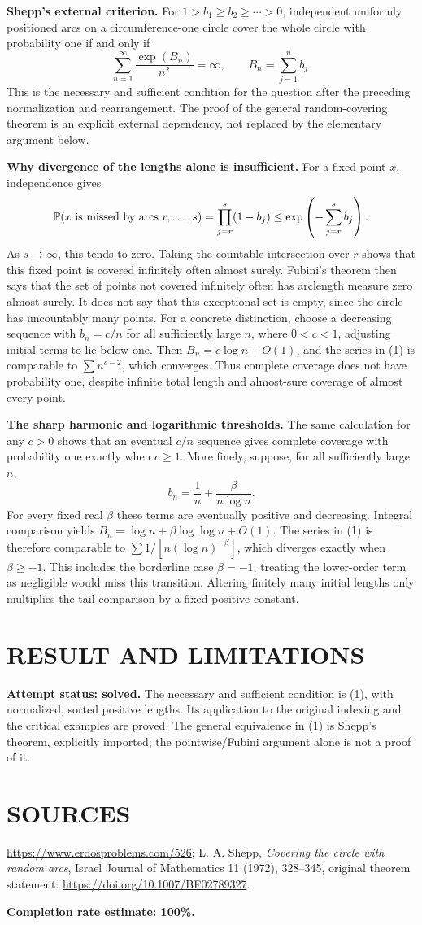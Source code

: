 \textbf{Shepp's external criterion.} For $1>b_1\geq b_2\geq\cdots>0$, independent uniformly positioned arcs on a circumference-one circle cover the whole circle with probability one if and only if
\[
 \boxed{\displaystyle\sum_{n=1}^\infty\frac{\exp(B_n)}{n^2}=\infty,
 \qquad B_n=\sum_{j=1}^n b_j.}                         \tag{1}
\]
This is the necessary and sufficient condition for the question after the preceding normalization and rearrangement. The proof of the general random-covering theorem is an explicit external dependency, not replaced by the elementary argument below.

\textbf{Why divergence of the lengths alone is insufficient.} For a fixed point $x$, independence gives
\[
 \mathbb P(x\hbox{ is missed by arcs }r,\ldots,s)
 =\prod_{j=r}^s(1-b_j)\leq\exp\left(-\sum_{j=r}^s b_j\right).
\]
As $s\to\infty$, this tends to zero. Taking the countable intersection over $r$ shows that this fixed point is covered infinitely often almost surely. Fubini's theorem then says that the set of points not covered infinitely often has arclength measure zero almost surely. It does not say that this exceptional set is empty, since the circle has uncountably many points.
For a concrete distinction, choose a decreasing sequence with $b_n=c/n$ for all sufficiently large $n$, where $0<c<1$, adjusting initial terms to lie below one. Then $B_n=c\log n+O(1)$, and the series in (1) is comparable to $\sum n^{c-2}$, which converges. Thus complete coverage does not have probability one, despite infinite total length and almost-sure coverage of almost every point.

\textbf{The sharp harmonic and logarithmic thresholds.} The same calculation for any $c>0$ shows that an eventual $c/n$ sequence gives complete coverage with probability one exactly when $c\geq1$. More finely, suppose, for all sufficiently large $n$,
\[
 b_n=\frac1n+\frac{\beta}{n\log n}.
\]
For every fixed real $\beta$ these terms are eventually positive and decreasing. Integral comparison yields
$B_n=\log n+\beta\log\log n+O(1)$.
The series in (1) is therefore comparable to
$\sum 1/[n(\log n)^{-\beta}]$, which diverges exactly when $\beta\geq-1$. This includes the borderline case $\beta=-1$; treating the lower-order term as negligible would miss this transition. Altering finitely many initial lengths only multiplies the tail comparison by a fixed positive constant.

\section{RESULT AND LIMITATIONS}
\textbf{Attempt status: solved.} The necessary and sufficient condition is (1), with normalized, sorted positive lengths. Its application to the original indexing and the critical examples are proved. The general equivalence in (1) is Shepp's theorem, explicitly imported; the pointwise/Fubini argument alone is not a proof of it.

\section{SOURCES}
\url{https://www.erdosproblems.com/526}; L. A. Shepp, \emph{Covering the circle with random arcs}, Israel Journal of Mathematics 11 (1972), 328--345, original theorem statement: \url{https://doi.org/10.1007/BF02789327}.

\textbf{Completion rate estimate: 100\%.}

